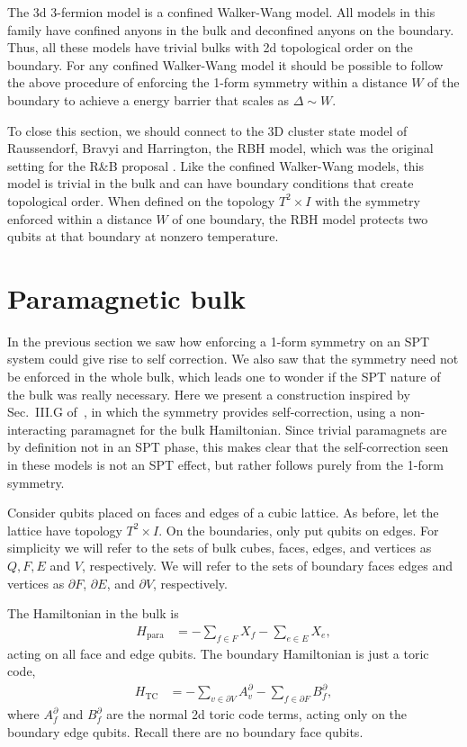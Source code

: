 \documentclass[twocolumn, longbibliography]{revtex4-2}
\newcommand{\TC}{\text{TC}}
\newcommand{\para}{\text{para}}
\begin{document}
The 3d 3-fermion model is a confined Walker-Wang model. All models in this family have confined anyons in the bulk and deconfined anyons on the boundary. Thus, all these models have trivial bulks with 2d topological order on the boundary. For any confined Walker-Wang model it should be possible to follow the above procedure of enforcing the 1-form symmetry within a distance $W$ of the boundary to achieve a energy barrier that scales as $\Delta\sim W$.

To close this section, we should connect to the 3D cluster state model of Raussendorf, Bravyi and Harrington, the RBH model, which was the original setting for the R\&B proposal \cite{RobertsBartlett}. Like the confined Walker-Wang models, this model is trivial in the bulk and can have boundary conditions that create topological order. When defined on the topology $T^2\times I$ with the symmetry enforced within a distance $W$ of one boundary, the RBH model protects two qubits at that boundary at nonzero temperature.

\section{Paramagnetic bulk} \label{sec:trivial}

In the previous section we saw how enforcing a 1-form symmetry on an SPT system could give rise to self correction. We also saw that the symmetry need not be enforced in the whole bulk, which leads one to wonder if the SPT nature of the bulk was really necessary. Here we present a construction inspired by Sec.~III.G of~\cite{RobertsBartlett}, in which the symmetry provides self-correction, using a non-interacting paramagnet for the bulk Hamiltonian. Since trivial paramagnets are by definition not in an SPT phase, this makes clear that the self-correction seen in these models is not an SPT effect, but rather follows purely from the 1-form symmetry.

Consider qubits placed on faces and edges of a cubic lattice. As before, let the lattice have topology $T^2\times I$. On the boundaries, only put qubits on edges. For simplicity we will refer to the sets of bulk cubes, faces, edges, and vertices as $Q, F, E$ and $V$, respectively. 
We will refer to the sets of boundary faces edges and vertices as $\partial F$, $\partial E$, and $\partial V$, respectively.

The Hamiltonian in the bulk is
\begin{align}
H_\para &= -\sum_{f\in F}X_f - \sum_{e\in E}X_e,
\end{align}
acting on all face and edge qubits. The boundary Hamiltonian is just a toric code,
\begin{align}
H_\TC &= -\sum_{v\in\partial V} A_v^\partial -\sum_{f\in\partial F}B^\partial_f,
\end{align}
where $A_f^\partial$ and $B_f^\partial$ are the normal 2d toric code terms, acting only on the boundary edge qubits. Recall there are no boundary face qubits.
\end{document}

